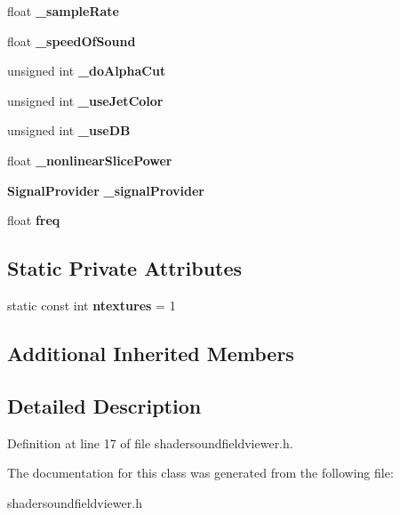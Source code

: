 \begin{DoxyCompactItemize}
\item 
float {\bfseries \-\_\-sample\-Rate}\label{classSoundfieldViewer_1_1ShaderSoundfieldViewer_a60a4a34762207efd13047bb14d3a4563}

\item 
float {\bfseries \-\_\-speed\-Of\-Sound}\label{classSoundfieldViewer_1_1ShaderSoundfieldViewer_adec68e5b55789f74e63da5b0de2441db}

\item 
unsigned int {\bfseries \-\_\-do\-Alpha\-Cut}\label{classSoundfieldViewer_1_1ShaderSoundfieldViewer_a3b063daeef014b0ea8e813ce34677945}

\item 
unsigned int {\bfseries \-\_\-use\-Jet\-Color}\label{classSoundfieldViewer_1_1ShaderSoundfieldViewer_a4505c284967b3f271ae945c44b68d0c4}

\item 
unsigned int {\bfseries \-\_\-use\-D\-B}\label{classSoundfieldViewer_1_1ShaderSoundfieldViewer_a87589effa69431e91298e2029571152f}

\item 
float {\bfseries \-\_\-nonlinear\-Slice\-Power}\label{classSoundfieldViewer_1_1ShaderSoundfieldViewer_ac331f864fa503f4686b495f86023b06c}

\item 
{\bf Signal\-Provider} {\bfseries \-\_\-signal\-Provider}\label{classSoundfieldViewer_1_1ShaderSoundfieldViewer_a3144e8df64b0ea2b1be5c7a83759db29}

\item 
float {\bfseries freq}\label{classSoundfieldViewer_1_1ShaderSoundfieldViewer_af9fd4c015501cf10807a72d10fdde9e2}

\end{DoxyCompactItemize}
\subsection*{Static Private Attributes}
\begin{DoxyCompactItemize}
\item 
static const int {\bfseries ntextures} = 1\label{classSoundfieldViewer_1_1ShaderSoundfieldViewer_a3f3c523f2623619802ea6c4c5e232526}

\end{DoxyCompactItemize}
\subsection*{Additional Inherited Members}


\subsection{Detailed Description}


Definition at line 17 of file shadersoundfieldviewer.\-h.



The documentation for this class was generated from the following file\-:\begin{DoxyCompactItemize}
\item 
shadersoundfieldviewer.\-h\end{DoxyCompactItemize}
